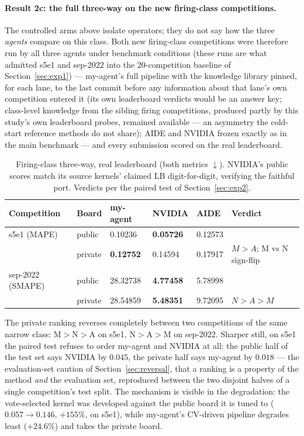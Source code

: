 \documentclass[11pt,a4paper]{article}
\newcommand{\dn}{\ensuremath{\downarrow}}
\newcommand{\M}{M}   %
\newcommand{\N}{N}   %
\newcommand{\A}{A}   %
\begin{document}
\paragraph{Result 2c: the full three-way on the new firing-class competitions.} The
controlled arms above isolate operators; they do not say how the three \emph{agents} compare
on this class. Both new firing-class competitions were therefore run by all three agents
under benchmark conditions (these runs are what admitted s5e1 and sep-2022 into the 20-competition baseline of Section~\ref{sec:exp1}) --- my-agent's full pipeline with the knowledge library pinned,
for each lane, to the last commit before any information about that lane's own competition
entered it (its own leaderboard verdicts would be an answer key; class-level knowledge from
the sibling firing competitions, produced partly by this study's own leaderboard probes,
remained available --- an asymmetry the cold-start reference methods do not share); AIDE and NVIDIA frozen
exactly as in the main benchmark --- and every submission scored on the real leaderboard.

\begin{table}[H]
\centering\small
\caption{Firing-class three-way, real leaderboard (both metrics \dn). NVIDIA's public
scores match its source kernels' claimed LB digit-for-digit, verifying the faithful port.
Verdicts per the paired test of Section~\ref{sec:exp2}.}
\begin{tabular}{@{}llllll@{}}
\toprule
\textbf{Competition} & \textbf{Board} & \textbf{my-agent} & \textbf{NVIDIA} & \textbf{AIDE} & \textbf{Verdict} \\
\midrule
s5e1 (MAPE) & public & 0.10236 & \textbf{0.05726} & 0.12573 & \\
 & private & \textbf{0.12752} & 0.14594 & 0.17917 & $\M > \A$;\; \M{} vs \N{} sign-flip \\
\midrule
sep-2022 (SMAPE) & public & 28.32738 & \textbf{4.77458} & 5.78998 & \\
 & private & 28.54859 & \textbf{5.48351} & 9.72095 & $\N > \A > \M$ \\
\bottomrule
\end{tabular}
\end{table}

The private ranking reverses completely between two competitions of the same narrow class:
\M{}${>}$\N{}${>}$\A{} on s5e1, \N{}${>}$\A{}${>}$\M{} on sep-2022. Sharper still, on s5e1
the paired test refuses to order my-agent and NVIDIA at all: the public half of the test set
says NVIDIA by $0.045$, the private half says my-agent by $0.018$ --- the
evaluation-set caution of Section~\ref{sec:reversal}, that a ranking is a property of the
method \emph{and} the evaluation set, reproduced between the two disjoint halves of a single
competition's test split. The mechanism is
visible in the degradation: the vote-selected kernel was developed against the public board
it is tuned to ($0.057 \to 0.146$, $+155\%$, on s5e1), while my-agent's CV-driven pipeline
degrades least ($+24.6\%$) and takes the private board.
\end{document}
